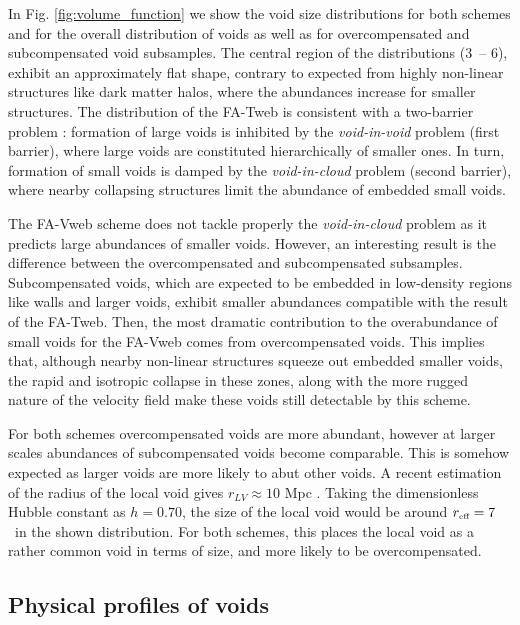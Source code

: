 \documentclass[a4,useAMS,usenatbib,usegraphicx]{latex/mn2e}
\begin{document}
In Fig. \ref{fig:volume_function} we show the void size distributions
for both schemes and for the overall distribution of voids as well as for 
overcompensated and subcompensated void subsamples. The central region of
the distributions ($3$\hMpc\ -- $6$\hMpc), exhibit an approximately flat 
shape, contrary to expected from highly non-linear structures like dark 
matter halos, where the abundances increase for smaller structures. 
The distribution of the FA-Tweb is consistent with a two-barrier problem 
\citep{Sheth04}: formation of large voids is inhibited by the 
\textit{void-in-void} problem (first barrier), where large voids are 
constituted hierarchically of smaller ones. In turn, formation of small 
voids is damped by the \textit{void-in-cloud} problem (second barrier), 
where nearby collapsing structures limit the abundance of embedded small 
voids.


The FA-Vweb scheme does not tackle properly the \textit{void-in-cloud} 
problem as it predicts large abundances of smaller voids. However, an 
interesting result is the difference between the overcompensated and 
subcompensated subsamples. Subcompensated voids, which are expected to 
be embedded in low-density regions like walls and larger voids, exhibit
smaller abundances compatible with the result of the FA-Tweb. Then, the 
most dramatic contribution to the overabundance of small voids for the 
FA-Vweb comes from overcompensated voids. This implies that, although
nearby non-linear structures squeeze out embedded smaller voids, the
rapid and isotropic collapse in these zones, along with the more rugged 
nature of the velocity field make these voids still detectable by this 
scheme.


For both schemes overcompensated voids are more abundant, however at 
larger scales abundances of subcompensated voids become comparable. This 
is somehow expected as larger voids are more likely to abut other voids.
A recent estimation of the radius of the local void gives $r_{LV}\approx
10$ Mpc \citep{Nasonova11}. Taking the dimensionless Hubble constant as 
$h = 0.70$, the size of the local void would be around $\reff = 7$
\hMpc\ in the shown distribution. For both schemes, this places the local
void as a rather common void in terms of size, and more likely to be
overcompensated.


\subsection{Physical profiles of voids}
\label{subsec:properties_voids}
\end{document}
